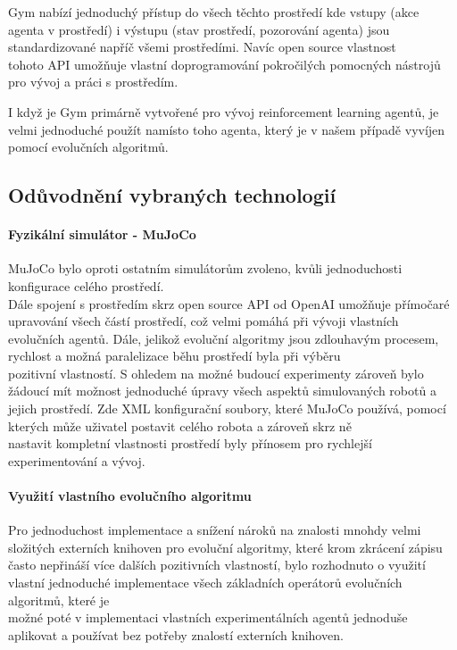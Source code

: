 \documentclass[a4paper, 12pt]{article}
\begin{document}
Gym nabízí jednoduchý přístup do všech těchto prostředí kde vstupy (akce agenta
v prostředí) i výstupu (stav prostředí, pozorování agenta) jsou standardizované
napříč všemi prostředími. Navíc open source vlastnost \\tohoto API umožňuje
vlastní doprogramování pokročilých pomocných nástrojů pro vývoj a práci s 
prostředím.

I když je Gym primárně vytvořené pro vývoj reinforcement learning agentů, je
velmi jednoduché použít namísto toho agenta, který je v našem případě
vyvíjen pomocí evolučních algoritmů.

\subsection{Odůvodnění vybraných technologií}
\paragraph{Fyzikální simulátor - MuJoCo} MuJoCo bylo oproti ostatním
simulátorům zvoleno, kvůli jednoduchosti konfigurace celého prostředí. \\Dále
spojení s prostředím skrz open source API od OpenAI umožňuje přímočaré
upravování všech částí prostředí, což velmi pomáhá při vývoji vlastních
evolučních agentů. Dále, jelikož evoluční algoritmy jsou zdlouhavým procesem,
rychlost a možná paralelizace běhu prostředí byla při výběru \\pozitivní
vlastností. S ohledem na možné budoucí experimenty zároveň bylo žádoucí mít
možnost jednoduché úpravy všech aspektů simulovaných robotů a jejich prostředí.
Zde XML konfigurační soubory, které MuJoCo používá, pomocí kterých může uživatel 
postavit celého robota a zároveň skrz ně \\nastavit kompletní vlastnosti prostředí 
byly přínosem pro rychlejší experimentování a vývoj.

\paragraph{Využití vlastního evolučního algoritmu} Pro jednoduchost
implementace a snížení nároků na znalosti mnohdy velmi složitých externích
knihoven pro evoluční algoritmy, které krom zkrácení zápisu často nepřináší
více dalších pozitivních vlastností, bylo rozhodnuto o využití vlastní
jednoduché implementace všech základních operátorů evolučních algoritmů, které
je \\možné poté v implementaci vlastních experimentálních agentů jednoduše
\\aplikovat a používat bez potřeby znalostí externích knihoven.
\end{document}
